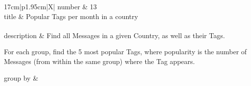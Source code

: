 \renewcommand*{\arraystretch}{1.5}
\noindent\begin{tabularx}{17cm}{|p{1.95cm}|X|}
	\hline
	number      & 13                                                          \\ \hline
	title       & Popular Tags per month in a country                                                           \\ \hline
	 \\ \hline
	description & Find all Messages in a given Country, as well as their Tags.

For each group, find the 5 most popular Tags, where popularity is the
number of Messages (from within the same group) where the Tag appears.
 \\ \hline
	
	group by       &
	\\ \hline
	

\end{tabularx}
